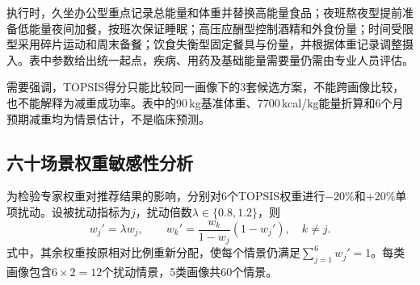 \begin{table}[H]
\centering
\scriptsize
\caption{五类画像推荐方案及主要数值}
\label{tab:q3-recommendations}
\end{table}

执行时，久坐办公型重点记录总能量和体重并替换高能量食品；夜班熬夜型提前准备低能量夜间加餐，按班次保证睡眠；高压应酬型控制酒精和外食份量；时间受限型采用碎片运动和周末备餐；饮食失衡型固定餐具与份量，并根据体重记录调整摄入。表中参数给出统一起点，疾病、用药及基础能量需要量仍需由专业人员评估。

需要强调，TOPSIS得分只能比较同一画像下的3套候选方案，不能跨画像比较，也不能解释为减重成功率。表中的90\,kg基准体重、7700\,kcal/kg能量折算和6个月预期减重均为情景估计，不是临床预测。

\subsection{六十场景权重敏感性分析}

为检验专家权重对推荐结果的影响，分别对6个TOPSIS权重进行$-20\%$和$+20\%$单项扰动。设被扰动指标为$j$，扰动倍数$\lambda\in\{0.8,1.2\}$，则
\begin{equation}
w_j'=\lambda w_j,\qquad
w_k'=\frac{w_k}{1-w_j}\left(1-w_j'\right),\quad k\neq j.
\end{equation}
式中，其余权重按原相对比例重新分配，使每个情景仍满足$\sum_{j=1}^{6}w_j'=1$。每类画像包含$6\times2=12$个扰动情景，5类画像共60个情景。

